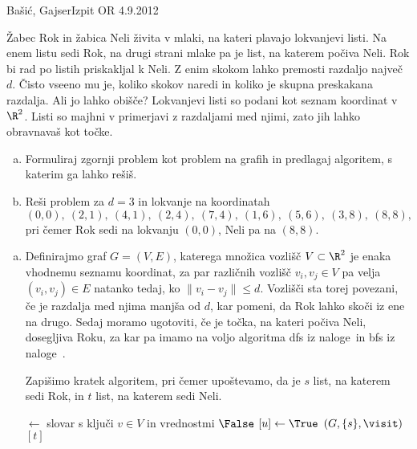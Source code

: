 \begin{naloga}{Bašić, Gajser}{Izpit OR 4.9.2012}
\begin{vprasanje}
Žabec Rok in žabica Neli živita v mlaki,
na kateri plavajo lokvanjevi listi.
Na enem listu sedi Rok,
na drugi strani mlake pa je list, na katerem počiva Neli.
Rok bi rad po listih priskakljal k Neli.
Z enim skokom lahko premosti razdaljo največ $d$.
Čisto vseeno mu je, koliko skokov naredi
in koliko je skupna preskakana razdalja.
Ali jo lahko obišče?
Lokvanjevi listi so podani kot seznam koordinat v $\R^2$.
Listi so majhni v primerjavi z razdaljami med njimi,
zato jih lahko obravnavaš kot točke.

\begin{enumerate}[(a)]
\item Formuliraj zgornji problem kot problem na grafih in predlagaj algoritem,
s katerim ga lahko rešiš.

\item Reši problem za $d = 3$ in lokvanje na koordinatah
$$
(0, 0), \ (2, 1), \ (4, 1), \ (2, 4), \ (7, 4),
\ (1, 6), \ (5, 6), \ (3, 8), \ (8, 8),
$$
pri čemer Rok sedi na lokvanju $(0, 0)$, Neli pa na $(8, 8)$.
\end{enumerate}
\end{vprasanje}

\begin{odgovor}
\begin{enumerate}[(a)]
\item Definirajmo graf $G = (V, E)$,
katerega množica vozlišč $V \subset \R^2$
je enaka vhod\-nemu seznamu koordinat,
za par različnih vozlišč $v_i, v_j \in V$
pa velja $(v_i, v_j) \in E$ natanko tedaj,
ko $\|v_i - v_j\|  \leq d$.
Vozlišči sta torej povezani, če je razdalja med njima manjša od $d$,
kar pomeni, da Rok lahko skoči iz ene na drugo.
Sedaj moramo ugotoviti, če je točka, na kateri počiva Neli, dosegljiva Roku, 
za kar pa imamo na voljo algoritma {\sc dfs} iz naloge~\res[dfs]
in {\sc bfs} iz naloge~\res[bfs].

Zapišimo kratek algoritem, pri čemer upoštevamo, da je $s$ list, na katerem sedi Rok, in $t$ list, na katerem sedi Neli.
\begin{small}
\begin{algorithmic}
	 $\gets$ slovar s ključi $v \in V$
                                 in vrednostmi $\False$
		$[u] \gets \True$
	\EndFunction
	$(G, \{s\}, \visit)$
	\State {}$[t]$
\EndFunction
\end{algorithmic}
\end{small}


\end{enumerate}
\end{odgovor}
\end{naloga}
